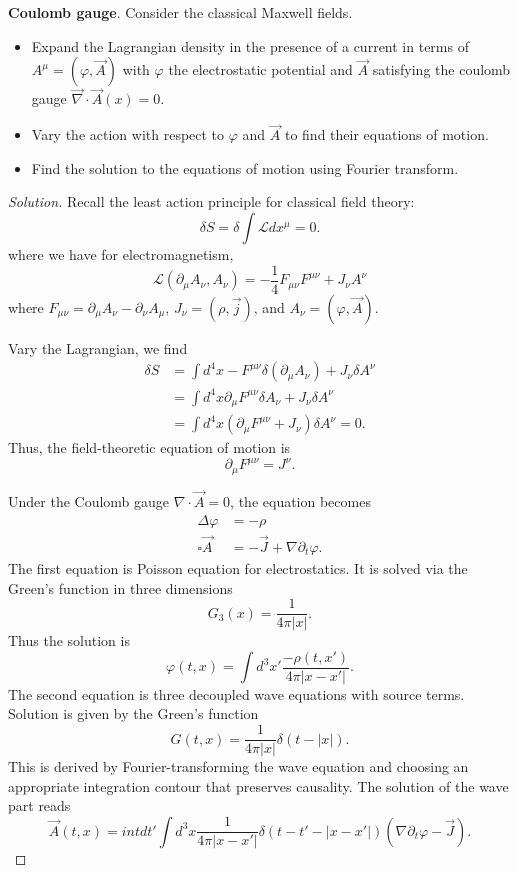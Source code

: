 \textbf{Coulomb gauge}. Consider the classical Maxwell fields.
\begin{itemize}
	\item Expand the Lagrangian density in the presence of a current in terms of $A^\mu = (\varphi, \vec{A} )$ with $\varphi$ the electrostatic potential and $\vec{A} $ satisfying the coulomb gauge $\vec{\nabla} \cdot \vec{A} (x) = 0$.
	\item Vary the action with respect to $\varphi$ and $\vec{A} $ to find their equations of motion.
	\item Find the solution to the equations of motion using Fourier transform.
\end{itemize}
\begin{proof}[Solution]
	Recall the least action principle for classical field theory:
	\[
		\delta S = \delta \int \mathcal{L} d x^\mu = 0
	.\] 
	where we have for electromagnetism,
	\[
		\mathcal{L}(\partial_\mu A_\nu, A_\nu)
		= - \frac{1}{4} F_{\mu \nu} F^{\mu \nu} + J_\nu A^\nu
	\] 
	where $F_{\mu \nu} = \partial_\mu A_\nu - \partial_\nu A_\mu$,  $J_\nu = (\rho, \vec{j} )$, and $A_\nu = (\varphi, \vec{A} )$.

	Vary the Lagrangian, we find
	\begin{align*}
		\delta S
		&= \int d^4 x - F^{\mu \nu} \delta \left( \partial _\mu A_\nu \right) + J_\nu \delta A^\nu \\
		&= \int d^4 x \partial _\mu F^{\mu \nu} \delta A_\nu  + J_\nu \delta A^\nu \\
		&= \int d^4 x \left(\partial _\mu F^{\mu \nu}  + J_\nu\right) \delta A^\nu = 0
	.\end{align*}
	Thus, the field-theoretic equation of motion is
	\[
		\partial _\mu F^{\mu \nu} = J^\nu
	.\] 

	Under the Coulomb gauge $\nabla \cdot  \vec{A} = 0$, the equation becomes
	\begin{align*}
		\Delta \varphi &= - \rho\\
		\square \vec{A}  &= - \vec{J} + \nabla  \partial_t \varphi
	.\end{align*}
	The first equation is Poisson equation for electrostatics. It is solved via the Green's function in three dimensions
	\[
		G_3(x) = \frac{1}{4 \pi |x|}
	.\] 
	Thus the solution is
	\[
		\varphi(t, x) = \int d^3 x' \frac{- \rho(t, x')}{4 \pi |x - x'|}
	.\] 
	The second equation is three decoupled wave equations with source terms. Solution is given by the Green's function
	\[
		G(t, x) = \frac{1}{4 \pi |x|} \delta\left(t-|x|\right) 
	.\] 
	This is derived by Fourier-transforming the wave equation and choosing an appropriate integration contour that preserves causality.
	The solution of the wave part reads
	\[
		\vec{A} (t, x) = 
		int dt' \int d^3 x \frac{1}{4 \pi |x - x'|} \delta\left(t-t'-|x-x'|\right) \left( \nabla  \partial_t \varphi - \vec{J}  \right) 
	.\] 

\end{proof}


